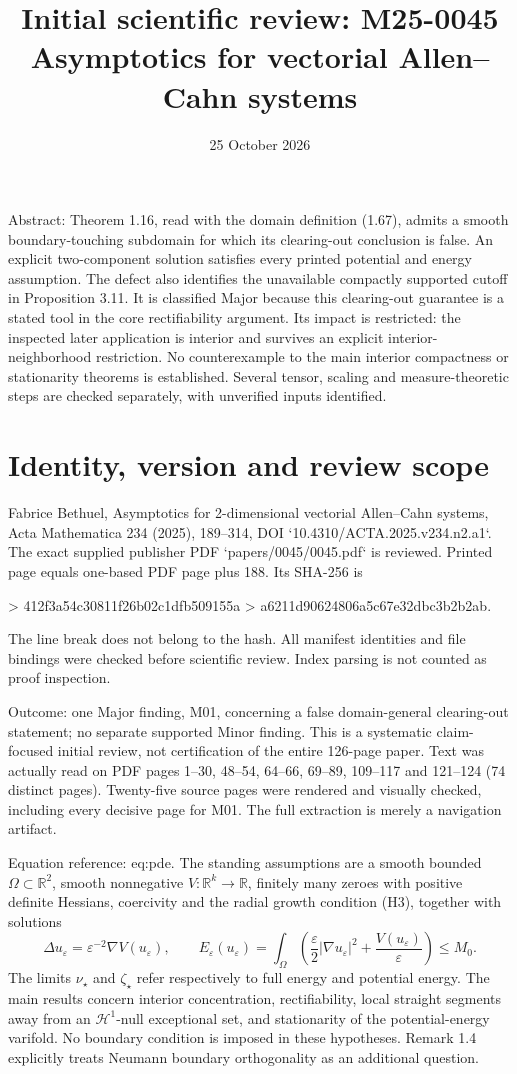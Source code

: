 \documentclass[10pt]{article}
\title{Initial scientific review: M25-0045
Asymptotics for vectorial Allen–Cahn systems}
\author{}
\date{25 October 2026}
\begin{document}
\maketitle
Abstract: Theorem 1.16, read with the domain definition (1.67), admits a smooth boundary-touching subdomain for which its clearing-out conclusion is false. An explicit two-component solution satisfies every printed potential and energy assumption. The defect also identifies the unavailable compactly supported cutoff in Proposition 3.11. It is classified Major because this clearing-out guarantee is a stated tool in the core rectifiability argument. Its impact is restricted: the inspected later application is interior and survives an explicit interior-neighborhood restriction. No counterexample to the main interior compactness or stationarity theorems is established. Several tensor, scaling and measure-theoretic steps are checked separately, with unverified inputs identified.\par
\section*{Identity, version and review scope}
Fabrice Bethuel, Asymptotics for 2-dimensional vectorial Allen–Cahn systems, Acta Mathematica 234 (2025), 189–314, DOI `10.4310/ACTA.2025.v234.n2.a1`. The exact supplied publisher PDF `papers/0045/0045.pdf` is reviewed. Printed page equals one-based PDF page plus 188. Its SHA-256 is\par
> 412f3a54c30811f26b02c1dfb509155a
> a6211d90624806a5c67e32dbc3b2b2ab.\par
The line break does not belong to the hash. All manifest identities and file bindings were checked before scientific review. Index parsing is not counted as proof inspection.\par
Outcome: one Major finding, M01, concerning a false domain-general clearing-out statement; no separate supported Minor finding. This is a systematic claim-focused initial review, not certification of the entire 126-page paper. Text was actually read on PDF pages 1–30, 48–54, 64–66, 69–89, 109–117 and 121–124 (74 distinct pages). Twenty-five source pages were rendered and visually checked, including every decisive page for M01. The full extraction is merely a navigation artifact.\par
Equation reference: eq:pde. The standing assumptions are a smooth bounded \(\Omega\subset\mathbb R^2\), smooth nonnegative \(V:\mathbb R^k\to\mathbb R\), finitely many zeroes with positive definite Hessians, coercivity and the radial growth condition (H3), together with solutions \[
 \Delta u_\varepsilon=\varepsilon^{-2}\nabla V(u_\varepsilon),\qquad
 E_\varepsilon(u_\varepsilon)=\int_\Omega
 \left(\frac{\varepsilon}{2}|\nabla u_\varepsilon|^2+
 \frac{V(u_\varepsilon)}{\varepsilon}\right)\le M_0 .\] The limits \(\nu_\star\) and \(\zeta_\star\) refer respectively to full energy and potential energy. The main results concern interior concentration, rectifiability, local straight segments away from an \(\mathcal H^1\)-null exceptional set, and stationarity of the potential-energy varifold. No boundary condition is imposed in these hypotheses. Remark 1.4 explicitly treats Neumann boundary orthogonality as an additional question.\par
\end{document}
